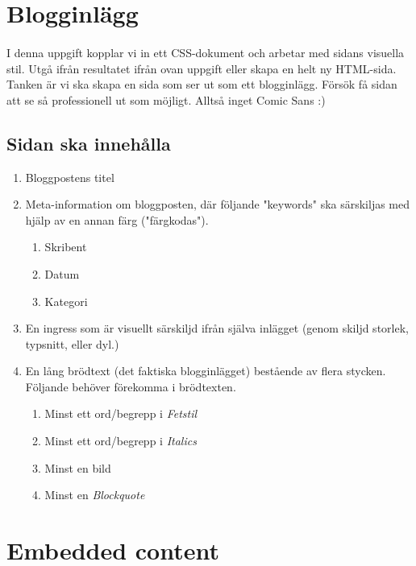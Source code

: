 \documentclass{article}
\begin{document}
  \newpage
  \section{ Blogginlägg }
    \paragraph{}
    I denna uppgift kopplar vi in ett CSS-dokument och arbetar med sidans visuella stil. Utgå ifrån resultatet ifrån ovan uppgift eller skapa en helt ny HTML-sida. Tanken är vi ska skapa en sida som ser ut som ett blogginlägg. Försök få sidan att se så professionell ut som möjligt. Alltså inget Comic Sans :)

    \subsection*{Sidan ska innehålla}
      \begin{enumerate}
        \item Bloggpostens titel
        \item Meta-information om bloggposten, där följande "keywords" ska särskiljas med hjälp av en annan färg ("färgkodas").
          \begin{enumerate}
            \item Skribent
            \item Datum
            \item Kategori
          \end{enumerate}
        \item En ingress som är visuellt särskiljd ifrån själva inlägget (genom skiljd storlek, typsnitt, eller dyl.)
        \item En lång brödtext (det faktiska blogginlägget) bestående av flera stycken. Följande behöver förekomma i brödtexten.
          \begin{enumerate}
            \item Minst ett ord/begrepp i \emph{Fetstil}
            \item Minst ett ord/begrepp i \emph{Italics}
            \item Minst en bild
            \item Minst en \emph{Blockquote}
          \end{enumerate}
      \end{enumerate}





  \newpage
  \section{ Embedded content }
\end{document}
